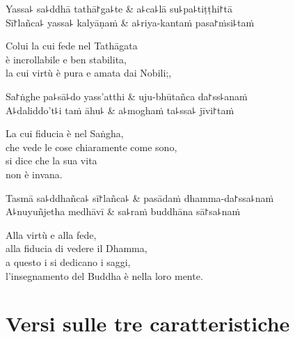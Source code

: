 \begin{twochants}
  Yassa꜕ sa꜕ddhā tathā꜓ga꜕te & a꜕ca꜕lā su꜕pa꜕tiṭṭhi꜓tā \\
  Sī꜓lañca꜕ yassa꜕ kalyāṇaṁ & a꜕riya-kantaṁ pasa꜓ṁsi꜕taṁ \\
\end{twochants}

\begin{english}
  Colui la cui fede nel Tathāgata\\
  è incrollabile e ben stabilita,\\
  la cui virtù è pura e amata dai Nobili;,

\end{english}

\begin{twochants}
  Sa꜓ṅghe pa꜕sā꜕do yass'atthi & uju-bhūtañca da꜓ss꜕anaṁ \\
  A꜕daliddo't꜕i taṁ āhu꜕ & a꜕moghaṁ ta꜕ssa꜕ jīvi꜓taṁ \\
\end{twochants}

\begin{english}
  La cui fiducia è nel Saṅgha,\\
  che vede le cose chiaramente come sono,\\
  si dice che la sua vita\\
  non è invana.
\end{english}

\begin{twochants}
  Tasmā sa꜕ddhañca꜕ sī꜓lañca꜕ & pasādaṁ dhamma-da꜓ssa꜕naṁ \\
  A꜕nuyuñjetha medhāvī & sa꜕raṁ buddhāna sā꜓sa꜕naṁ \\
\end{twochants}

\begin{english}
  Alla virtù e alla fede,\\
  alla fiducia di vedere il Dhamma,\\
  a questo i si dedicano i saggi,\\
  l'insegnamento del Buddha è nella loro mente.
\end{english}

\chapter{Versi sulle tre caratteristiche}


\begin{leader}
\end{leader}

